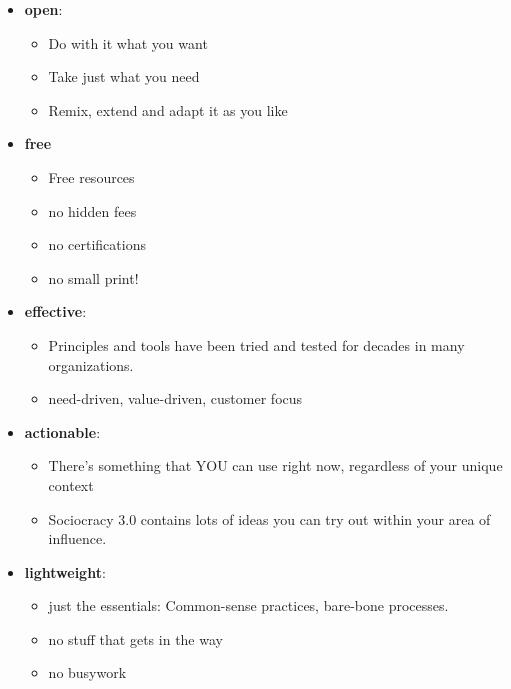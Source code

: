 \begin{itemize}
\item \textbf{open}:

\begin{itemize}
\item Do with it what you want

\item Take just what you need

\item Remix, extend and adapt it as you like

\end{itemize}

\item \textbf{free}

\begin{itemize}
\item Free resources

\item no hidden fees

\item no certifications

\item no small print!

\end{itemize}

\item \textbf{effective}:

\begin{itemize}
\item Principles and tools have been tried and tested for decades in many organizations.

\item need-driven, value-driven, customer focus

\end{itemize}

\item \textbf{actionable}:

\begin{itemize}
\item There's something that YOU can use right now, regardless of your unique context

\item Sociocracy 3.0 contains lots of ideas you can try out within your area of influence.

\end{itemize}

\item \textbf{lightweight}:

\begin{itemize}
\item just the essentials: Common-sense practices, bare-bone processes.

\item no stuff that gets in the way

\item no busywork

\end{itemize}

\end{itemize}

